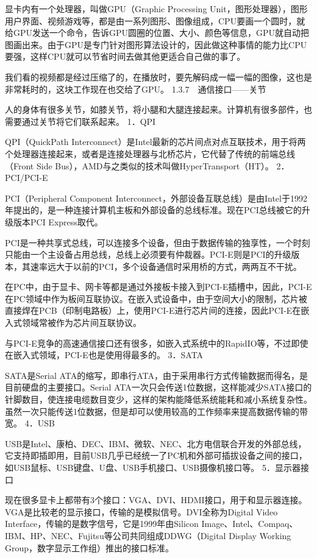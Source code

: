 \documentclass[12pt,UTF8]{ctexbook}
\begin{document}
显卡内有一个处理器，叫做GPU（Graphic Processing Unit，图形处理器），图形用户界面、视频游戏等，都是由一系列图形、图像组成，CPU要画一个圆时，就给GPU发送一个命令，告诉GPU圆圈的位置、大小、颜色等信息，GPU就自动把图画出来。由于GPU是专门针对图形算法设计的，因此做这种事情的能力比CPU要强，这样CPU就可以节省时间去做其他更适合自己做的事了。

我们看的视频都是经过压缩了的，在播放时，要先解码成一幅一幅的图像，这也是非常耗时的，这块工作现在也交给了GPU。
1.3.7　通信接口——关节

人的身体有很多关节，如膝关节，将小腿和大腿连接起来。计算机有很多部件，也需要通过关节将它们联系起来。
1．QPI

QPI（QuickPath Interconnect）是Intel最新的芯片间点对点互联技术，用于将两个处理器连接起来，或者是连接处理器与北桥芯片，它代替了传统的前端总线（Front Side Bus），AMD与之类似的技术叫做HyperTransport（HT）。
2．PCI/PCI-E

PCI（Peripheral Component Interconnect，外部设备互联总线）是由Intel于1992年提出的，是一种连接计算机主板和外部设备的总线标准。现在PCI总线被它的升级版本PCI Express取代。

PCI是一种共享式总线，可以连接多个设备，但由于数据传输的独享性，一个时刻只能由一个主设备占用总线，总线上必须要有仲裁器。PCI-E则是PCI的升级版本，其速率远大于以前的PCI，多个设备通信时采用桥的方式，两两互不干扰。

在PC中，由于显卡、网卡等都是通过外接板卡接入到PCI-E插槽中，因此，PCI-E在PC领域中作为板间互联协议。在嵌入式设备中，由于空间大小的限制，芯片被直接焊在PCB（印制电路板）上，使用PCI-E进行芯片间的连接，因此PCI-E在嵌入式领域常被作为芯片间互联协议。

与PCI-E竞争的高速通信接口还有很多，如嵌入式系统中的RapidIO等，不过即使在嵌入式领域，PCI-E也是使用得最多的。
3．SATA

SATA是Serial ATA的缩写，即串行ATA，由于采用串行方式传输数据而得名，是目前硬盘的主要接口。Serial ATA一次只会传送1位数据，这样能减少SATA接口的针脚数目，使连接电缆数目变少，这样的架构能降低系统能耗和减小系统复杂性。虽然一次只能传送1位数据，但是却可以使用较高的工作频率来提高数据传输的带宽。
4．USB

USB是Intel、康柏、DEC、IBM、微软、NEC、北方电信联合开发的外部总线，它支持即插即用，目前USB几乎已经统一了PC机和外部可插拔设备之间的接口，如USB鼠标、USB键盘、U盘、USB手机接口、USB摄像机接口等。
5．显示器接口

现在很多显卡上都带有3个接口：VGA、DVI、HDMI接口，用于和显示器连接。VGA是比较老的显示接口，传输的是模拟信号。DVI全称为Digital Video Interface，传输的是数字信号，它是1999年由Silicon Image、Intel、Compaq、IBM、HP、NEC、Fujitsu等公司共同组成DDWG（Digital Display Working Group，数字显示工作组）推出的接口标准。
\end{document}

